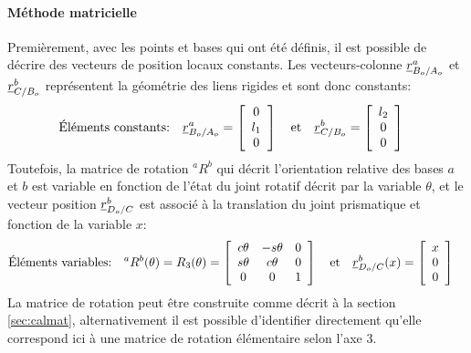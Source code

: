 \paragraph{Méthode matricielle}

Premièrement, avec les points et bases qui ont été définis, il est possible de décrire des vecteurs de position locaux constants. Les vecteurs-colonne $\underline{r}_{B_o/A_o}^a$ et $\underline{r}_{C/B_o}^b$ représentent la géométrie des liens rigides et sont donc constants:
\begin{align}
	\text{Éléments constants:}& \quad \underline{r}_{B_o/A_o}^a =  \left[ \begin{array}{c}
																		0 \\ l_1 \\ 0
	\end{array} \right]  \quad \text{et} \quad  \underline{r}_{C/B_o}^b =  \left[ \begin{array}{c}
																				l_2 \\ 0 \\ 0
	\end{array} \right]
\end{align}
Toutefois, la matrice de rotation ${}^aR^b$ qui décrit l'orientation relative des bases $a$ et $b$ est variable en fonction de l'état du joint rotatif décrit par la variable $\theta$, et le vecteur position $\underline{r}_{D_o/C}^b$ est associé à la translation du joint prismatique et fonction de la variable $x$:
\begin{align}
	\text{Éléments variables:}& \quad {}^aR^b(\theta)= R_3(\theta) = \left[ \begin{array}{c c c}
																				c\theta & -s\theta & 0 \\
																				s\theta & c\theta & 0 \\
																				0 & 0 & 1
	\end{array}  \right]  \quad \text{et} \quad  \underline{r}_{D_o/C}^b(x) =  \left[ \begin{array}{c}
																					x \\ 0 \\ 0
	\end{array} \right]
\end{align}
La matrice de rotation peut être construite comme décrit à la section \ref{sec:calmat}, alternativement il est possible d’identifier directement qu'elle correspond ici à une matrice de rotation élémentaire selon l'axe 3.

